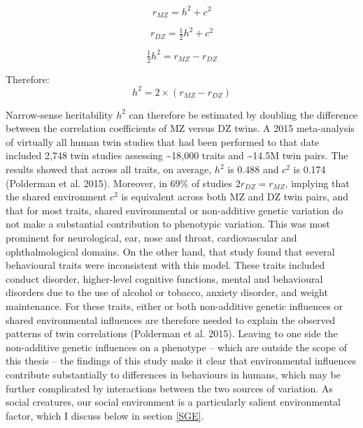 \documentclass[
]{book}
\begin{document}
\begin{equation}
r_{MZ} = h^2 + c^2
\end{equation}

\begin{equation}
r_{DZ} = \tfrac{1}{2}h^2 + c^2
\end{equation}

\begin{equation}
\tfrac{1}{2}h^2 = r_{MZ} - r_{DZ}
\end{equation}

Therefore:
\begin{equation}
h^2 = 2\times(r_{MZ} - r_{DZ})
\end{equation}

Narrow-sense heritability \(h^2\) can therefore be estimated by doubling the difference between the correlation coefficients of MZ versus DZ twins. A 2015 meta-analysis of virtually all human twin studies that had been performed to that date included 2,748 twin studies assessing \textasciitilde18,000 traits and \textasciitilde14.5M twin pairs. The results showed that across all traits, on average, \(h^2\) is 0.488 and \(c^2\) is 0.174 (Polderman et al. 2015). Moreover, in 69\% of studies \(2r_{DZ} = r_{MZ}\), implying that the shared environment \(c^2\) is equivalent across both MZ and DZ twin pairs, and that for most traits, shared environmental or non-additive genetic variation do not make a substantial contribution to phenotypic variation. This was most prominent for neurological, ear, nose and throat, cardiovascular and ophthalmological domains. On the other hand, that study found that several behavioural traits were inconsistent with this model. These traits included conduct disorder, higher-level cognitive functions, mental and behavioural disorders due to the use of alcohol or tobacco, anxiety disorder, and weight maintenance. For these traits, either or both non-additive genetic influences or shared environmental influences are therefore needed to explain the observed patterns of twin correlations (Polderman et al. 2015). Leaving to one side the non-additive genetic influences on a phenotype -- which are outside the scope of this thesis -- the findings of this study make it clear that environmental influences contribute substantially to differences in behaviours in humans, which may be further complicated by interactions between the two sources of variation. As social creatures, our social environment is a particularly salient environmental factor, which I discuss below in section \ref{SGE}.
\end{document}
